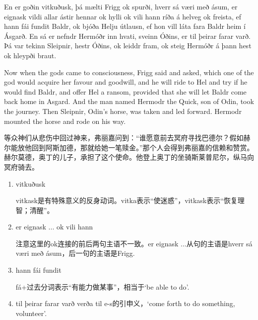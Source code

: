 \begin{paracol}{2}
    En er goðin vitkuðusk, þá mælti Frigg ok spurði, hverr sá væri með ásum, er eignask vildi allar ástir hennar ok hylli ok vili hann ríða á helveg ok freista, ef hann fái fundit Baldr, ok bjóða Helju útlausn, ef hon vill láta fara Baldr heim í Ásgarð. En sá er nefndr Hermóðr inn hvati, sveinn Óðins, er til þeirar farar varð. Þá var tekinn Sleipnir, hestr Óðins, ok leiddr fram, ok steig Hermóðr á þann hest ok hleypði braut.
    \switchcolumn

    Now when the gods came to consciousness, Frigg said and asked, which one of the god would acquire her favour and goodwill, and he will ride to Hel and try if he would find Baldr, and offer Hel a ransom, provided that she will let Baldr come back home in Asgard. And the man named Hermodr the Quick, son of Odin, took the journey. Then Sleipnir, Odin's horse, was taken and led forward. Hermodr mounted the horse and rode on his way.
\end{paracol}
\begin{translation*}{}
    等众神们从悲伤中回过神来，弗丽嘉问到：“谁愿意前去冥府寻找巴德尔？假如赫尔能放他回到阿斯加德，那就给她一笔赎金。”那个人会得到弗丽嘉的信赖和赞赏。赫尔莫德，奥丁的儿子，承担了这个使命。他登上奥丁的坐骑斯莱普尼尔，纵马向冥府骑去。
\end{translation*}
\begin{grammar*}{}
    \begin{enumerate}[leftmargin=*]
        \item vitkuðusk

              vitkask是有特殊意义的反身动词。vitka表示“使迷惑”，vitkask表示“恢复理智；清醒”。

        \item er eignask ... ok vili hann

              注意这里的ok连接的前后两句主语不一致。er eignask ...从句的主语是hverr sá væri með ásum，后一句的主语是Frigg.

        \item hann fái fundit

              fá+过去分词表示“有能力做某事”，相当于`be able to do'.

        \item til þeirar farar varð
              verða til e-s的引申义，`come forth to do something, volunteer'.
    \end{enumerate}
\end{grammar*}
\hspace*{\fill}\\
